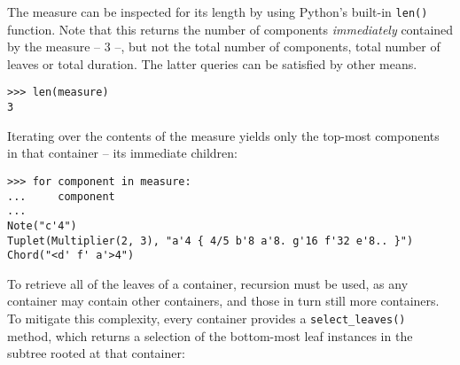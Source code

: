 \noindent The measure can be inspected for its length by using Python's
built-in \texttt{len()} function. Note that this returns the number of
components \emph{immediately} contained by the measure -- 3 --, but not the
total number of components, total number of leaves or total duration. The
latter queries can be satisfied by other means.

\begin{comment}
<abjad>
len(measure)
</abjad>
\end{comment}

\begin{abjadbookoutput}
\begin{singlespacing}
\vspace{-0.5\baselineskip}
\begin{lstlisting}
>>> len(measure)
3
\end{lstlisting}
\end{singlespacing}
\end{abjadbookoutput}

\noindent Iterating over the contents of the  measure yields only
the top-most components in that container -- its immediate children:

\begin{comment}
<abjad>
for component in measure:
    component

</abjad>
\end{comment}

\begin{abjadbookoutput}
\begin{singlespacing}
\vspace{-0.5\baselineskip}
\begin{lstlisting}
>>> for component in measure:
...     component
...
Note("c'4")
Tuplet(Multiplier(2, 3), "a'4 { 4/5 b'8 a'8. g'16 f'32 e'8.. }")
Chord("<d' f' a'>4")
\end{lstlisting}
\end{singlespacing}
\end{abjadbookoutput}

\noindent To retrieve all of the leaves of a container, recursion must be used,
as any container may contain other containers, and those in turn still more
containers. To mitigate this complexity, every container provides a
\texttt{select\_leaves()} method, which returns a selection of the bottom-most
leaf instances in the subtree rooted at that container:

\begin{comment}
<abjad>
for leaf in measure.select_leaves():
    leaf

</abjad>
\end{comment}

